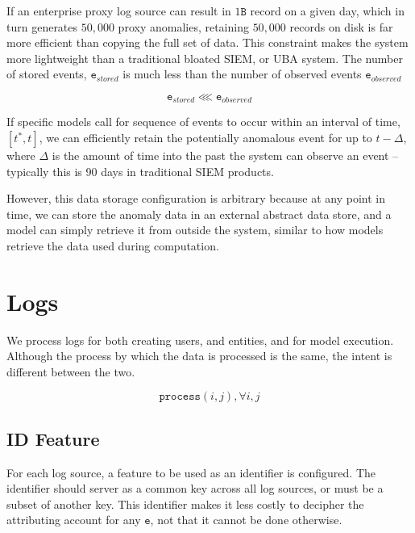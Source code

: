 \documentclass[10pt, titlepage, twocolumn]{report}
\begin{document}
If an enterprise proxy log source can result in \(1\texttt{B}\) record on a given day, which in turn generates \(50,000\) proxy anomalies, retaining \(50,000\) records on disk is far more efficient than copying the full set of data. This constraint makes the system more lightweight than a traditional bloated SIEM, or UBA system. The number of stored events, \(\texttt{e}_{stored}\) is much less than the number of observed events \(\texttt{e}_{observed}\)

\begin{equation}
\texttt{e}_{stored} \lll \texttt{e}_{observed}
\end{equation}

If specific models call for sequence of events to occur within an interval of time, \([t^*,t]\), we can efficiently retain the potentially anomalous event for up to \(t - \Delta\), where \(\Delta\) is the amount of time into the past the system can observe an event -- typically this is 90 days in traditional SIEM products. 

However, this data storage configuration is arbitrary because at any point in time, we can store the anomaly data in an external abstract data store, and a model can simply retrieve it from outside the system, similar to how models retrieve the data used during computation.






\section{Logs}
We process logs for both creating users, and entities, and for model execution. Although the process by which the data is processed is the same, the intent is different between the two.

\begin{equation}
\texttt{process}(i, j), \forall i,j 
\end{equation}

\subsection{ID Feature}
For each log source, a feature to be used as an identifier is configured. The identifier should server as a common key across all log sources, or must be a subset of another key. This identifier makes it less costly to decipher the attributing account for any \(\texttt{e}\), not that it cannot be done otherwise.
\end{document}
